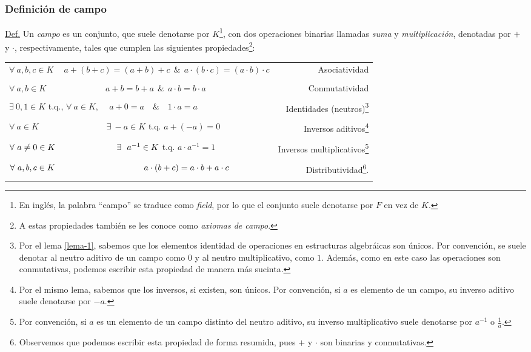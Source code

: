 \documentclass[apuntes]{subfiles}
\begin{document}
\subsubsection{Definición de campo} \label{Sssec: Definición de campo}

\begin{tcolorbox}
    \underline{Def.} Un \emph{campo} es un conjunto, que suele denotarse por $K$\footnote{En inglés, la palabra ``campo'' se traduce como \emph{field}, por lo que el conjunto suele denotarse por $F$ en vez de $K$.}, con dos operaciones binarias llamadas \emph{suma} y \emph{multiplicación}, denotadas por $+$ y $\cdot$, respectivamente, tales que cumplen las siguientes propiedades\footnote{A estas propiedades también se les conoce como \emph{axiomas de campo}.}:

\begin{center}
\begin{tabular}{lr}
    \\
    $\forall \ a,b,c\in K \quad \ a+(b+c)=(a+b)+c \ \ \& \ \ a\cdot (b\cdot c)=(a\cdot b)\cdot c$ & Asociatividad \\ \\
    $\forall \ a,b\in K \quad \quad \quad \quad \quad \quad \quad a+b=b+a \ \ \& \ \ a\cdot b = b\cdot a$ & Conmutatividad \\ \\
    $\exists \ 0,1\in K$ t.q., $\forall \ a\in K$, \ \ \quad $a+0=a \quad \& \quad 1\cdot a=a$ & Identidades (neutros)\footnote{Por el lema \ref{lema-1}, sabemos que los elementos identidad de operaciones en estructuras algebráicas son únicos. Por convención, se suele denotar al neutro aditivo de un campo como $0$ y al neutro multiplicativo, como $1$. Además, como en este caso las operaciones son conmutativas, podemos escribir esta propiedad de manera más sucinta.} \\ \\
    $\forall \ a\in K \quad \quad \quad \quad \quad \quad \quad \quad \exists \ -a\in K$ \quad t.q. \quad $a + (-a) = 0$ & Inversos aditivos\footnote{Por el mismo lema, sabemos que los inversos, si existen, son únicos. Por convención, si $a$ es elemento de un campo, su inverso aditivo suele denotarse por $-a$.} \\ \\
    $\forall \ a\neq0\in K \hspace{2.55cm} \exists \ \ a^{-1}\in K$ \quad t.q. \quad $a\cdot a^{-1}= 1$ & Inversos multiplicativos\footnote{Por convención, si $a$ es un elemento de un campo distinto del neutro aditivo, su inverso multiplicativo suele denotarse por $a^{-1}$ o $\frac{1}{a}$.} \\ \\
    $\forall \ a,b,c\in K \hspace{3.7cm}a\cdot (b+c) = a\cdot b+a\cdot c$ & Distributividad\footnote{Observemos que podemos escribir esta propiedad de forma resumida, pues $+$ y $\cdot$ son binarias y conmutativas.}.\\ \\
\end{tabular}
\end{center}
\end{tcolorbox}
\end{document}
